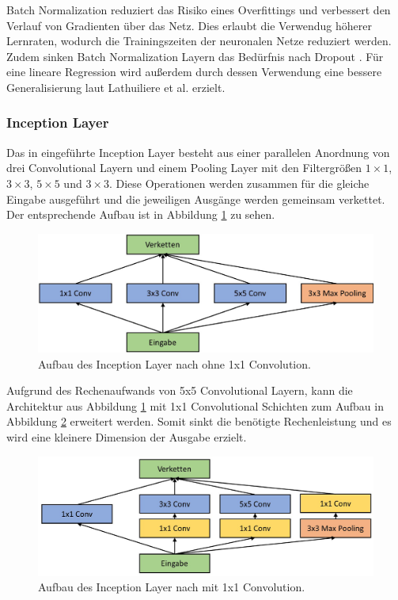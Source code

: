 \mypar Batch Normalization reduziert das Risiko eines Overfittings und verbessert den Verlauf von Gradienten über das Netz. Dies erlaubt die Verwendug höherer Lernraten, wodurch die Trainingszeiten der neuronalen Netze reduziert  werden. Zudem sinken Batch Normalization Layern das Bedürfnis nach Dropout \cite{recent-advances-in-cnns}. Für eine lineare Regression wird außerdem durch dessen Verwendung eine bessere Generalisierung laut Lathuiliere et al. \cite{lathuiliere2019comprehensive} erzielt.


\subsubsection{Inception Layer}
Das in \cite{going-deeper-with-convolutions} eingeführte Inception Layer besteht aus einer parallelen Anordnung von drei Convolutional Layern und einem Pooling Layer mit den Filtergrößen $1\times1$, $3\times3$, $5\times5$ und $3\times3$. Diese Operationen werden zusammen für die gleiche Eingabe ausgeführt und die jeweiligen Ausgänge werden gemeinsam verkettet. Der entsprechende Aufbau ist in Abbildung \ref{fig:inception1} zu sehen. \cite{going-deeper-with-convolutions}

\begin{figure}[h!]
\centering
\includegraphics[width=12cm]{98_images/inception_layer1.png}
\caption{Aufbau des Inception Layer nach \cite{going-deeper-with-convolutions} ohne 1x1 Convolution.}
\label{fig:inception1}
\end{figure}

Aufgrund des Rechenaufwands von 5x5 Convolutional Layern, kann die Architektur aus Abbildung \ref{fig:inception1} mit 1x1 Convolutional Schichten zum Aufbau in Abbildung \ref{fig:inception2} erweitert werden. Somit sinkt die benötigte Rechenleistung und es wird eine kleinere Dimension der Ausgabe erzielt. \cite{going-deeper-with-convolutions}

\begin{figure}[h!]
\centering
\includegraphics[width=12cm]{98_images/inception_layer2.png}
\caption{Aufbau des Inception Layer nach \cite{going-deeper-with-convolutions} mit 1x1 Convolution.}
\label{fig:inception2}
\end{figure}

